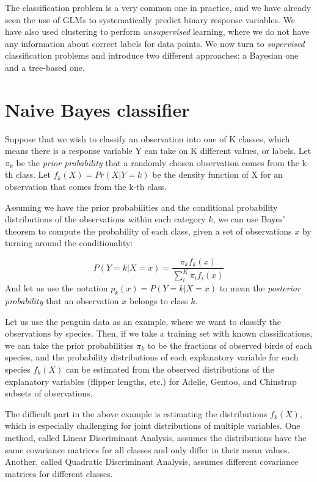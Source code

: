 \documentclass[
  letterpaper,
  DIV=11,
  numbers=noendperiod]{scrreprt}
\begin{document}
The classification problem is a very common one in practice, and we have
already seen the use of GLMs to systematically predict binary response
variables. We have also used clustering to perform \emph{unsupervised}
learning, where we do not have any information about correct labels for
data points. We now turn to \emph{supervised} classification problems
and introduce two different approaches: a Bayesian one and a tree-based
one.

\section{Naive Bayes classifier}\label{naive-bayes-classifier}

Suppose that we wish to classify an observation into one of K classes,
which means there is a response variable Y can take on K different
values, or labels. Let \(π_k\) be the \emph{prior probability} that a
randomly chosen observation comes from the k-th class. Let
\(f_k(X) =Pr(X|Y = k)\) be the density function of X for an observation
that comes from the k-th class.

Assuming we have the prior probabilities and the conditional probability
distributions of the observations within each category \(k\), we can use
Bayes' theorem to compute the probability of each class, given a set of
observations \(x\) by turning around the conditionality:

\[
P(Y = k | X = x) = \frac{\pi_k f_k(x)}{\sum_i^K \pi_i f_i(x)}
\] And let us use the notation \(p_k (x) = P(Y = k | X = x)\) to mean
the \emph{posterior probability} that an observation \(x\) belongs to
class \(k\).

Let us use the penguin data as an example, where we want to classify the
observations by species. Then, if we take a training set with known
classifications, we can take the prior probabilities \(\pi_k\) to be the
fractions of observed birds of each species, and the probability
distributions of each explanatory variable for each species \(f_k(X)\)
can be estimated from the observed distributions of the explanatory
variables (flipper lengths, etc.) for Adelie, Gentoo, and Chinstrap
subsets of observations.

The difficult part in the above example is estimating the distributions
\(f_k(X)\), which is especially challenging for joint distributions of
multiple variables. One method, called Linear Discriminant Analysis,
assumes the distributions have the same covariance matrices for all
classes and only differ in their mean values. Another, called Quadratic
Discriminant Analysis, assumes different covariance matrices for
different classes.
\end{document}
